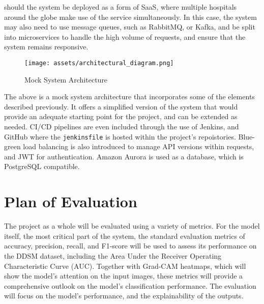 \documentclass[../main]{subfiles}
\begin{document}
should the system be deployed as a form of SaaS, where multiple hospitals around the globe make use of the service simultaneously. In this case, the system may also need to use message queues, such as RabbitMQ, or Kafka, and be split into microservices to handle the high volume of requests, and ensure that the system remains responsive.

\begin{figure}[htbp]
    \centering
    \texttt{[image: assets/architectural\_diagram.png]}
    \caption{Mock System Architecture}
    \label{fig:system_architecture}
\end{figure}

\noindent The above is a mock system architecture that incorporates some of the elements described previously. It offers a simplified version of the system that would provide an adequate starting point for the project, and can be extended as needed. CI/CD pipelines are even included through the use of Jenkins, and GitHub where the \texttt{jenkinsfile} is hosted within the project's repoistories. Blue-green load balancing is also introduced to manage API versions within requests, and JWT for authentication. Amazon Aurora is used as a database, which is PostgreSQL compatible.

\section{Plan of Evaluation}
The project as a whole will be evaluated using a variety of metrics. For the model itself, the most critical part of the system, the standard evaluation metrics of accuracy, precision, recall, and F1-score will be used to assess its performance on the DDSM dataset, including the Area Under the Receiver Operating Characteristic Curve (AUC). Together with Grad-CAM heatmaps, which will show the model's attention on the input images, these metrics will provide a comprehensive outlook on the model's classification performance. The evaluation will focus on the model's performance, and the explainability of the outputs.
\end{document}
